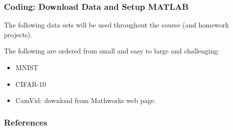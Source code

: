 \documentclass[12pt,fleqn]{beamer}
\begin{document}
\begin{frame}\frametitle{Coding: Download Data and Setup MATLAB}

The following data sets will be used throughout the course (and homework projects).

\bigskip

The following are ordered from small and easy to large and challenging:
\begin{itemize}
	\item MNIST
	\item CIFAR-10
	\item CamVid: download from Mathworks web page. 
\end{itemize}

\end{frame}

\begin{frame}[allowframebreaks]
	\frametitle{References}
 


\end{frame}
\end{document}
